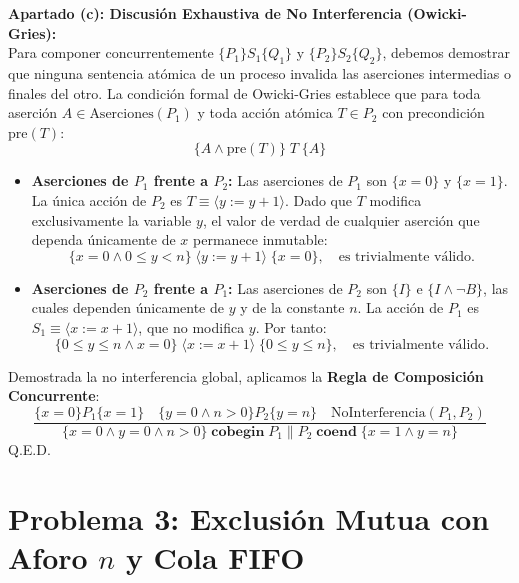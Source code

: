 \documentclass[11pt,a4paper,twoside,openright]{report}
\begin{document}
\begin{solucion}
\textbf{Apartado (c): Discusión Exhaustiva de No Interferencia (Owicki-Gries):}\\
Para componer concurrentemente $\{P_1\} S_1 \{Q_1\}$ y $\{P_2\} S_2 \{Q_2\}$, debemos demostrar que ninguna sentencia atómica de un proceso invalida las aserciones intermedias o finales del otro.
La condición formal de Owicki-Gries establece que para toda aserción $A \in \text{Aserciones}(P_1)$ y toda acción atómica $T \in P_2$ con precondición $\text{pre}(T)$:
\[
\{A \land \text{pre}(T)\} \; T \; \{A\}
\]
\begin{itemize}
    \item \textbf{Aserciones de $P_1$ frente a $P_2$:} Las aserciones de $P_1$ son $\{x = 0\}$ y $\{x = 1\}$. La única acción de $P_2$ es $T \equiv \langle y := y + 1 \rangle$. Dado que $T$ modifica exclusivamente la variable $y$, el valor de verdad de cualquier aserción que dependa únicamente de $x$ permanece inmutable:
    \[
    \{x = 0 \land 0 \le y < n\} \; \langle y := y + 1 \rangle \; \{x = 0\}, \quad \text{es trivialmente válido}.
    \]
    \item \textbf{Aserciones de $P_2$ frente a $P_1$:} Las aserciones de $P_2$ son $\{I\}$ e $\{I \land \neg B\}$, las cuales dependen únicamente de $y$ y de la constante $n$. La acción de $P_1$ es $S_1 \equiv \langle x := x + 1 \rangle$, que no modifica $y$. Por tanto:
    \[
    \{0 \le y \le n \land x = 0\} \; \langle x := x + 1 \rangle \; \{0 \le y \le n\}, \quad \text{es trivialmente válido}.
    \]
\end{itemize}
Demostrada la no interferencia global, aplicamos la \textbf{Regla de Composición Concurrente}:
\[
\frac{\{x = 0\} P_1 \{x = 1\} \quad \{y = 0 \land n > 0\} P_2 \{y = n\} \quad \text{NoInterferencia}(P_1, P_2)}{\{x = 0 \land y = 0 \land n > 0\} \; \mathbf{cobegin} \; P_1 \parallel P_2 \; \mathbf{coend} \; \{x = 1 \land y = n\}}
\]
Q.E.D.
\end{solucion}

\newpage

\section{Problema 3: Exclusión Mutua con Aforo \texorpdfstring{$n$}{n} y Cola FIFO}
\end{document}
